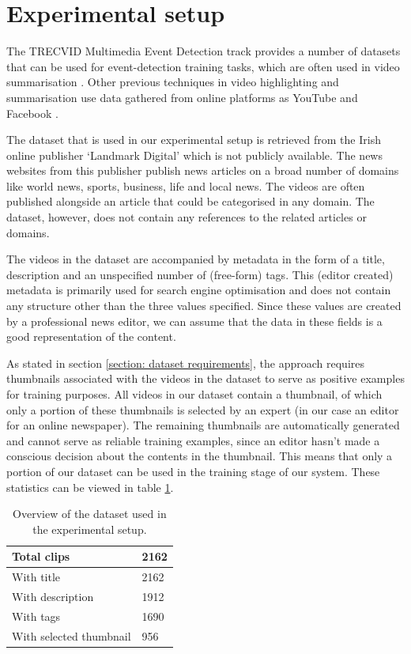 \documentclass{../resources/sig-alternate-05-2015}
\begin{document}
\section{Experimental setup}
\label{experimental setup dataset}

The TRECVID Multimedia Event Detection track provides a number of datasets that can be used for event-detection training tasks, which are often used in video summarisation \cite{Ajmal:2012hi, Christel:2004in, Money:2008fn}. Other previous techniques in video highlighting and summarisation use data gathered from online platforms as YouTube and Facebook \cite{Yang:2015gi, Almeida:2012be}.

The dataset that is used in our experimental setup is retrieved from the Irish online publisher `Landmark Digital' which is not publicly available. The news websites from this publisher publish news articles on a broad number of domains like world news, sports, business, life and local news. The videos are often published alongside an article that could be categorised in any domain. The dataset, however, does not contain any references to the related articles or domains.

The videos in the dataset are accompanied by metadata in the form of a title, description and an unspecified number of (free-form) tags. This (editor created) metadata is primarily used for search engine optimisation and does not contain any structure other than the three values specified. Since these values are created by a professional news editor, we can assume that the data in these fields is a good representation of the content.

As stated in section \ref{section: dataset requirements}, the approach requires thumbnails associated with the videos in the dataset to serve as positive examples for training purposes. All videos in our dataset contain a thumbnail, of which only a portion of these thumbnails is selected by an expert (in our case an editor for an online newspaper). The remaining thumbnails are automatically generated and cannot serve as reliable training examples, since an editor hasn't made a conscious decision about the contents in the thumbnail. This means that only a portion of our dataset can be used in the training stage of our system. These statistics can be viewed in table \ref{table:dataset}.

\begin{table}[h]
\caption{Overview of the dataset used in the experimental setup.}
\label{table:dataset}
\begin{tabular}{ll}
Total clips                    & 2162 \\ \hline
With title                     & 2162 \\
With description               & 1912 \\
With tags                      & 1690 \\
With selected thumbnail        & 956 
\end{tabular}
\end{table}
\end{document}
